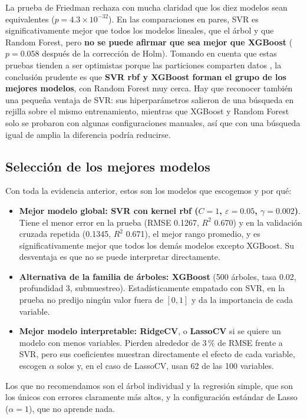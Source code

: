 \documentclass[11pt,a4paper]{article}
\let\citepOriginal\citep
\renewcommand*{\citep}[1]{\textbf{\citepOriginal{#1}}}%
\begin{document}
La prueba de Friedman rechaza con mucha claridad que los diez modelos sean equivalentes ($p=4.3\times10^{-32}$). En las comparaciones en pares, SVR es significativamente mejor que todos los modelos lineales, que el árbol y que Random Forest, pero \textbf{no se puede afirmar que sea mejor que XGBoost} ($p=0.058$ después de la corrección de Holm). Tomando en cuenta que estas pruebas tienden a ser optimistas porque las particiones comparten datos \citep{nadeau2003}, la conclusión prudente es que \textbf{SVR rbf y XGBoost forman el grupo de los mejores modelos}, con Random Forest muy cerca. Hay que reconocer también una pequeña ventaja de SVR: sus hiperparámetros salieron de una búsqueda en rejilla sobre el mismo entrenamiento, mientras que XGBoost y Random Forest solo se probaron con algunas configuraciones manuales, así que con una búsqueda igual de amplia la diferencia podría reducirse.

\subsection{Selección de los mejores modelos}
Con toda la evidencia anterior, estos son los modelos que escogemos y por qué:
\begin{itemize}
  \item \textbf{Mejor modelo global: SVR con kernel rbf ($C=1$, $\varepsilon=0.05$, $\gamma=0.002$)}. Tiene el menor error en la prueba (RMSE 0.1267, $R^2$ 0.670) y en la validación cruzada repetida (0.1345, $R^2$ 0.671), el mejor rango promedio, y es significativamente mejor que todos los demás modelos excepto XGBoost. Su desventaja es que no se puede interpretar directamente.
  \item \textbf{Alternativa de la familia de árboles: XGBoost} (500 árboles, tasa 0.02, profundidad 3, submuestreo). Estadísticamente empatado con SVR, en la prueba no predijo ningún valor fuera de $[0,1]$ y da la importancia de cada variable.
  \item \textbf{Mejor modelo interpretable: RidgeCV}, o \textbf{LassoCV} si se quiere un modelo con menos variables. Pierden alrededor de 3\,\% de RMSE frente a SVR, pero sus coeficientes muestran directamente el efecto de cada variable, escogen $\alpha$ solos y, en el caso de LassoCV, usan 62 de las 100 variables.
\end{itemize}
Los que no recomendamos son el árbol individual y la regresión simple, que son los únicos con errores claramente más altos, y la configuración estándar de Lasso ($\alpha=1$), que no aprende nada.
\end{document}
